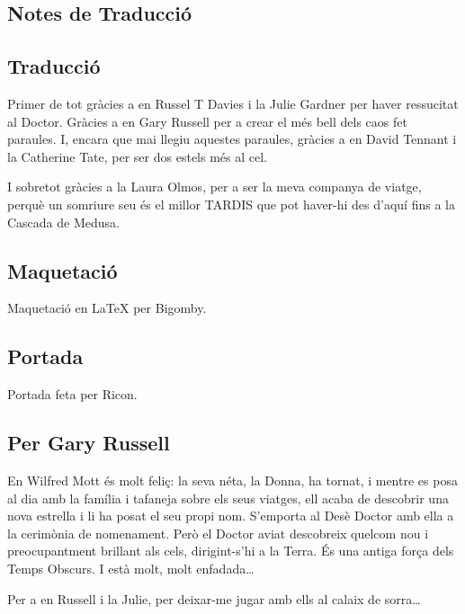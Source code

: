 \begin{center}
\section*{Notes de Traducció}
\end{center}

\subsection*{Traducció}\label{traducciuxf3n}

Primer de tot gràcies a en Russel T Davies i la Julie Gardner per haver ressucitat al Doctor. Gràcies a en Gary Russell per a crear el més bell dels caos fet paraules. I, encara que mai llegiu aquestes paraules, gràcies a en David Tennant i la Catherine Tate, per ser dos estels més al cel.

I sobretot gràcies a la Laura Olmos, per a ser la meva companya de viatge, perquè un somriure seu és el millor TARDIS que pot haver-hi des d’aquí fins a la Cascada de Medusa.

\subsection*{Maquetació}\label{maquetaciuxf3n}

Maquetació en LaTeX per Bigomby.

\subsection*{Portada}\label{portada}

Portada feta per Ricon.

\clearpage

\subsection*{Per Gary Russell}\label{autor}

En Wilfred Mott és molt feliç: la seva néta, la Donna, ha tornat, i
mentre es posa al dia amb la família i tafaneja sobre els seus viatges,
ell acaba de descobrir una nova estrella i li ha posat el seu propi nom.
S'emporta al Desè Doctor amb ella a la cerimònia de nomenament. Però el
Doctor aviat descobreix quelcom nou i preocupantment brillant als cels,
dirigint-s'hi a la Terra. És una antiga força dels Temps Obscurs. I està
molt, molt enfadada\ldots{}

\clearpage

Per a en Russell i la Julie, per deixar-me jugar amb ells al calaix de
sorra\ldots{}
